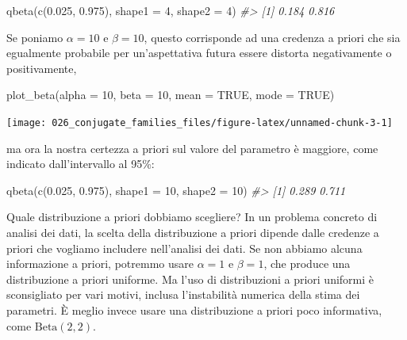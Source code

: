 \documentclass[
  10pt,
  italian,
  a4paper,
  extrafontsizes,onecolumn,openright
  ]{memoir}
\newenvironment{Shaded}{\begin{snugshade}}{\end{snugshade}}
\newcommand{\AttributeTok}[1]{\textcolor[rgb]{0.77,0.63,0.00}{#1}}
\newcommand{\CommentTok}[1]{\textcolor[rgb]{0.56,0.35,0.01}{\textit{#1}}}
\newcommand{\ConstantTok}[1]{\textcolor[rgb]{0.00,0.00,0.00}{#1}}
\newcommand{\DecValTok}[1]{\textcolor[rgb]{0.00,0.00,0.81}{#1}}
\newcommand{\FloatTok}[1]{\textcolor[rgb]{0.00,0.00,0.81}{#1}}
\newcommand{\FunctionTok}[1]{\textcolor[rgb]{0.00,0.00,0.00}{#1}}
\newcommand{\NormalTok}[1]{#1}
\theoremstyle{definition}
\theoremstyle{definition}
\theoremstyle{definition}
\theoremstyle{definition}
\theoremstyle{remark}
\begin{document}
\begin{Shaded}
\begin{Highlighting}[]
\FunctionTok{qbeta}\NormalTok{(}\FunctionTok{c}\NormalTok{(}\FloatTok{0.025}\NormalTok{, }\FloatTok{0.975}\NormalTok{), }\AttributeTok{shape1 =} \DecValTok{4}\NormalTok{, }\AttributeTok{shape2 =} \DecValTok{4}\NormalTok{)}
\CommentTok{\#\textgreater{} [1] 0.184 0.816}
\end{Highlighting}
\end{Shaded}

Se poniamo \(\alpha=10\) e \(\beta=10\), questo corrisponde ad una credenza a priori che sia egualmente probabile per un'aspettativa futura essere distorta negativamente o positivamente,

\begin{Shaded}
\begin{Highlighting}[]
\FunctionTok{plot\_beta}\NormalTok{(}\AttributeTok{alpha =} \DecValTok{10}\NormalTok{, }\AttributeTok{beta =} \DecValTok{10}\NormalTok{, }\AttributeTok{mean =} \ConstantTok{TRUE}\NormalTok{, }\AttributeTok{mode =} \ConstantTok{TRUE}\NormalTok{)}
\end{Highlighting}
\end{Shaded}

\begin{center}\texttt{[image: 026\_conjugate\_families\_files/figure-latex/unnamed-chunk-3-1]} \end{center}

\noindent
ma ora la nostra certezza a priori sul valore del parametro è maggiore, come indicato dall'intervallo al 95\%:

\begin{Shaded}
\begin{Highlighting}[]
\FunctionTok{qbeta}\NormalTok{(}\FunctionTok{c}\NormalTok{(}\FloatTok{0.025}\NormalTok{, }\FloatTok{0.975}\NormalTok{), }\AttributeTok{shape1 =} \DecValTok{10}\NormalTok{, }\AttributeTok{shape2 =} \DecValTok{10}\NormalTok{)}
\CommentTok{\#\textgreater{} [1] 0.289 0.711}
\end{Highlighting}
\end{Shaded}

Quale distribuzione a priori dobbiamo scegliere? In un problema concreto di analisi dei dati, la scelta della distribuzione a priori dipende dalle credenze a priori che vogliamo includere nell'analisi dei dati. Se non abbiamo alcuna informazione a priori, potremmo usare \(\alpha=1\) e \(\beta=1\), che produce una distribuzione a priori uniforme. Ma l'uso di distribuzioni a priori uniformi è sconsigliato per vari motivi, inclusa l'instabilità numerica della stima dei parametri. È meglio invece usare una distribuzione a priori poco informativa, come \(\mbox{Beta}(2, 2)\).
\end{document}
